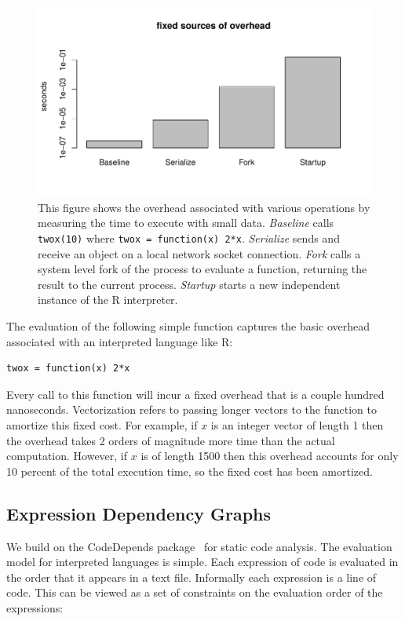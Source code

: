 \documentclass[12pt]{article}
\begin{document}
\begin{figure}
\centering
\includegraphics[width=.8\linewidth]{compute_times/overhead}

    \caption{
        This figure shows the overhead associated with various
    operations by measuring the time to execute with small data. 
    \emph{Baseline} calls \texttt{twox(10)} where \texttt{twox = function(x) 2*x}.
    \emph{Serialize} sends and receive an object on a local network socket connection.
    \emph{Fork} calls a system level fork of the process to evaluate a
    function, returning the result to the current process.
    \emph{Startup} starts a new independent instance of the R interpreter.
    }
\label{fig:overhead}
\end{figure}

The evaluation of the following simple
function captures the basic overhead associated with an interpreted
language like R:
\begin{verbatim}
twox = function(x) 2*x
\end{verbatim}
Every call to this function will incur a fixed overhead that is a couple
hundred nanoseconds. Vectorization refers to passing longer vectors to the
function to amortize this fixed cost. For example, if $x$ is an integer
vector of length 1 then the overhead takes 2 orders of magnitude more time
than the actual computation. However, if $x$ is of length 1500 then this
overhead accounts for only 10 percent of the total execution time, so the
fixed cost has been amortized.

\subsection{Expression Dependency Graphs}

\label{sec:expression_dependency}

We build on the CodeDepends package~\cite{R-CodeDepends} for static code
analysis.  The evaluation model for interpreted languages is simple. Each
expression of code is evaluated in the order that it appears in a text
file. Informally each expression is a line of code. This can be viewed as a
set of constraints on the evaluation order of the expressions:
\end{document}

